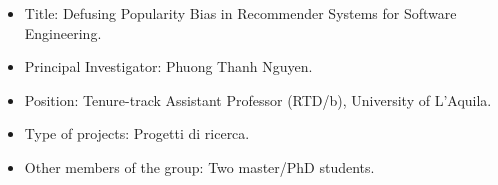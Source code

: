 \begin{itemize}
	\item Title: Defusing Popularity Bias in Recommender Systems for Software Engineering.
	\item Principal Investigator: Phuong Thanh Nguyen.
	\item Position: Tenure-track Assistant Professor (RTD/b), University of L'Aquila.
	\item Type of projects: Progetti di ricerca.
	\item Other members of the group: Two master/PhD students.
\end{itemize}
\vspace{-.4cm}